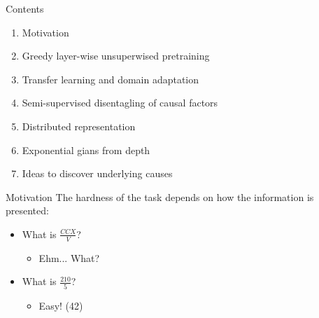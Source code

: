 
\begin{frame}{Contents}
\begin{enumerate}
  \item Motivation
  \item Greedy layer-wise unsuperwised pretraining
  \item Transfer learning and domain adaptation
  \item Semi-supervised disentagling of causal factors
  \item Distributed representation
  \item Exponential gians from depth
  \item Ideas to discover underlying causes
\end{enumerate}
\end{frame}


\begin{frame}{Motivation}
The hardness of the task depends on how the information is presented:
\begin{itemize}
\item What is $\frac{CCX}{V}$?
\begin{itemize}
\item Ehm... What?
\end{itemize}
\item What is $\frac{210}{5}$?
\begin{itemize}
\item Easy! (42)
\end{itemize}
\end{itemize}

\end{frame}

